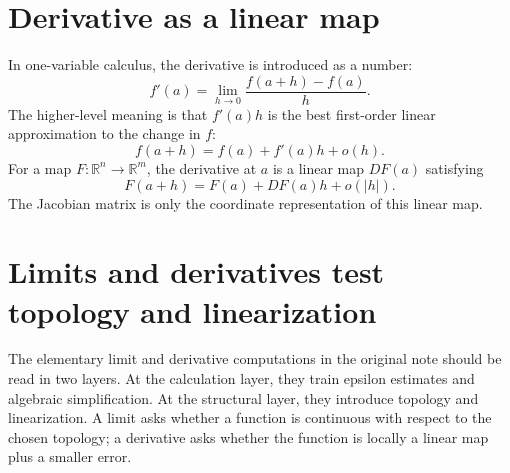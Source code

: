 \section{Derivative as a linear map}

In one-variable calculus, the derivative is introduced as a number:
\[
  f'(a)=\lim_{h\to0}\frac{f(a+h)-f(a)}h.
\]
The higher-level meaning is that $f'(a)h$ is the best first-order linear approximation to the change in $f$:
\[
  f(a+h)=f(a)+f'(a)h+o(h).
\]
For a map $F:\mathbb R^n\to\mathbb R^m$, the derivative at $a$ is a linear map $DF(a)$ satisfying
\[
  F(a+h)=F(a)+DF(a)h+o(|h|).
\]
The Jacobian matrix is only the coordinate representation of this linear map.

\section{Limits and derivatives test topology and linearization}

The elementary limit and derivative computations in the original note should be read in two layers.  At the calculation layer, they train epsilon estimates and algebraic simplification.  At the structural layer, they introduce topology and linearization.  A limit asks whether a function is continuous with respect to the chosen topology; a derivative asks whether the function is locally a linear map plus a smaller error.
